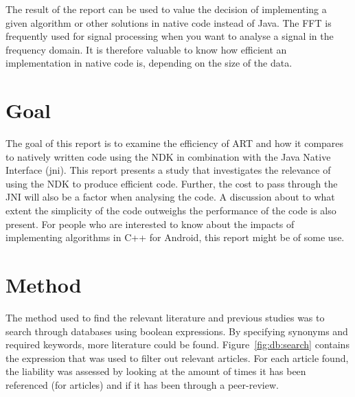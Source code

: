 
The result of the report can be used to value the decision of implementing a given algorithm or other solutions in native code instead of Java. The FFT is frequently used for signal processing when you want to analyse a signal in the frequency domain. It is therefore valuable to know how efficient an implementation in native code is, depending on the size of the data.

\section{Goal}
The goal of this report is to examine the efficiency of ART and how it compares to natively written code using the NDK in combination with the Java Native Interface (\gls{jni}). This report presents a study that investigates the relevance of using the NDK to produce efficient code. Further, the cost to pass through the JNI will also be a factor when analysing the code. A discussion about to what extent the simplicity of the code outweighs the performance of the code is also present. For people who are interested to know about the impacts of implementing algorithms in C++ for Android, this report might be of some use.

\section{Method}

The method used to find the relevant literature and previous studies was to search through databases using boolean expressions. By specifying synonyms and required keywords, more literature could be found. Figure~\ref{fig:db:search} contains the expression that was used to filter out relevant articles. For each article found, the liability was assessed by looking at the amount of times it has been referenced (for articles) and if it has been through a peer-review.

